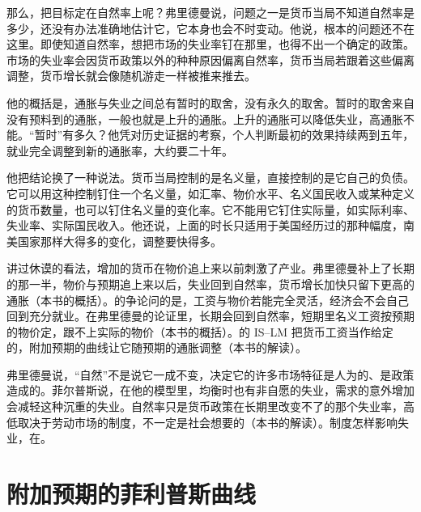 那么，把目标定在自然率上呢？弗里德曼说，问题之一是货币当局不知道自然率是多少，还没有办法准确地估计它，它本身也会不时变动\cite{friedman1968}。他说，根本的问题还不在这里。即使知道自然率，想把市场的失业率钉在那里，也得不出一个确定的政策\cite{friedman1968}。市场的失业率会因货币政策以外的种种原因偏离自然率，货币当局若跟着这些偏离调整，货币增长就会像随机游走一样被推来推去\cite{friedman1968}。

他的概括是，通胀与失业之间总有暂时的取舍，没有永久的取舍\cite{friedman1968}。暂时的取舍来自没有预料到的通胀，一般也就是上升的通胀\cite{friedman1968}。上升的通胀可以降低失业，高通胀不能\cite{friedman1968}。“暂时”有多久？他凭对历史证据的考察，个人判断最初的效果持续两到五年，就业完全调整到新的通胀率，大约要二十年\cite{friedman1968}。

他把结论换了一种说法。货币当局控制的是名义量，直接控制的是它自己的负债\cite{friedman1968}。它可以用这种控制钉住一个名义量，如汇率、物价水平、名义国民收入或某种定义的货币数量，也可以钉住名义量的变化率\cite{friedman1968}。它不能用它钉住实际量，如实际利率、失业率、实际国民收入\cite{friedman1968}。他还说，上面的时长只适用于美国经历过的那种幅度，南美国家那样大得多的变化，调整要快得多\cite{friedman1968}。

讲过休谟的看法，增加的货币在物价追上来以前刺激了产业。弗里德曼补上了长期的那一半，物价与预期追上来以后，失业回到自然率，货币增长加快只留下更高的通胀（本书的概括）。的争论问的是，工资与物价若能完全灵活，经济会不会自己回到充分就业。在弗里德曼的论证里，长期会回到自然率，短期里名义工资按预期的物价定，跟不上实际的物价（本书的概括）。的 IS–LM 把货币工资当作给定的，附加预期的曲线让它随预期的通胀调整（本书的解读）。

\begin{pitfall}[自然失业率就是应该有的失业率]
弗里德曼说，“自然”不是说它一成不变，决定它的许多市场特征是人为的、是政策造成的\cite{friedman1968}。菲尔普斯说，在他的模型里，均衡时也有非自愿的失业，需求的意外增加会减轻这种沉重的失业\cite{phelps2006}。自然率只是货币政策在长期里改变不了的那个失业率，高低取决于劳动市场的制度，不一定是社会想要的（本书的解读）。制度怎样影响失业，在。
\end{pitfall}

\section{附加预期的菲利普斯曲线}\label{sec:naturalrate-model}

